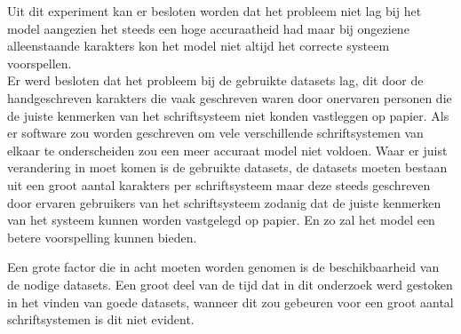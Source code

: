 Uit dit experiment kan er besloten worden dat het probleem niet lag bij het model aangezien het steeds een hoge accuraatheid had maar bij ongeziene alleenstaande karakters kon het model niet altijd het correcte systeem voorspellen. \\
Er werd besloten dat het probleem bij de gebruikte datasets lag, dit door de handgeschreven karakters die vaak geschreven waren door onervaren personen die de juiste kenmerken van het schriftsysteem niet konden vastleggen op papier.
Als er software zou worden geschreven om vele verschillende schriftsystemen van elkaar te onderscheiden zou een meer accuraat model niet voldoen.
Waar er juist verandering in moet komen is de gebruikte datasets, de datasets moeten bestaan uit een groot aantal karakters per schriftsysteem maar deze steeds geschreven door ervaren gebruikers van het schriftsysteem zodanig dat de juiste kenmerken van het systeem kunnen worden vastgelegd op papier. 
En zo zal het model een betere voorspelling kunnen bieden.

Een grote factor die in acht moeten worden genomen is de beschikbaarheid van de nodige datasets. Een groot deel van de tijd dat in dit onderzoek werd gestoken in het vinden van goede datasets, wanneer dit zou gebeuren voor een groot aantal schriftsystemen is dit niet evident.







